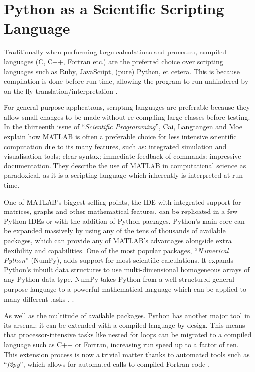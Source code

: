 \documentclass{report}
\newcommand{\tit}[1]{\textit{#1}}
\newcommand{\propernoun}[1]{\enquote{\tit{#1}}}
\begin{document}
    
    \section{Python as a Scientific Scripting Language}
    Traditionally when performing large calculations and processes, compiled languages (C, C++, Fortran etc.) are the preferred choice over scripting languages such as Ruby, JavaScript, (pure) Python, et cetera. This is because compilation is done before run-time, allowing the program to run unhindered by on-the-fly translation/interpretation \cite{Cai2005}.
    
    For general purpose applications, scripting languages are preferable because they allow small changes to be made without re-compiling large classes before testing. In the thirteenth issue of \propernoun{Scientific Programming}, Cai, Langtangen and Moe \cite{Cai2005} explain how MATLAB is often a preferable choice for less intensive scientific computation due to its many features, such as: integrated simulation and visualisation tools; clear syntax; immediate feedback of commands; impressive documentation. They describe the use of MATLAB in computational science as paradoxical, as it is a scripting language which inherently is interpreted at run-time.
    
    One of MATLAB's biggest selling points, the IDE with integrated support for matrices, graphs and other mathematical features, can be replicated in a few Python IDEs or with the addition of Python packages. Python's main core can be expanded massively by using any of the tens of thousands of available packages, which can provide any of MATLAB's advantages alongside extra flexibility and capabilities. One of the most popular packages, \propernoun{Numerical Python} (NumPy), adds support for most scientific calculations. It expands Python's inbuilt data structures to use multi-dimensional homogeneous arrays of any Python data type. NumPy takes Python from a well-structured general-purpose language to a powerful mathematical language which can be applied to many different tasks \cite{Cai2005}, \cite{Oliphant2006}.
    
    As well as the multitude of available packages, Python has another major tool in its arsenal: it can be extended with a compiled language by design. This means that processor-intensive tasks like nested for loops can be migrated to a compiled language such as C++ or Fortran, increasing run speed up to a factor of ten. This extension process is now a trivial matter thanks to automated tools such as \propernoun{f2py}, which allows for automated calls to compiled Fortran code \cite{Oliphant2006}.
    
\end{document}
